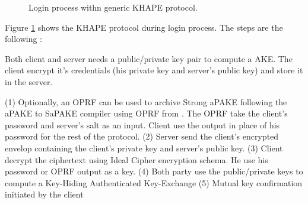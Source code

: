 \documentclass[../report.tex]{subfiles}
\begin{document}
\begin{figure}[h]
 \centering
 
 \setlength{\fboxsep}{10pt}
 \setlength{\fboxrule}{1pt}
 
 \caption{Login process withn generic KHAPE protocol.}
 \label{fig:Generic_KHAPE}
\end{figure}

Figure \ref{fig:Generic_KHAPE} shows the KHAPE protocol during login process.
The steps are the following :

Both client and server needs a public/private key pair to compute a AKE. The client encrypt it's credentials (his private key and server's public key) and store it in the server.


(1) Optionally, an OPRF can be used to archive Strong aPAKE following the aPAKE to SaPAKE compiler using OPRF from \cite{OPAQUE_Paper}. The OPRF take the client's password and server's salt as an input. Client use the output in place of his password for the rest of the protocol.
(2) Server send the client's encrypted envelop containing the client's private key and server's public key.
(3) Client decrypt the ciphertext using Ideal Cipher encryption schema. He use his password or OPRF output as a key.
(4) Both party use the public/private keys to compute a Key-Hiding Authenticated Key-Exchange
(5) Mutual key confirmation initiated by the client
\end{document}
